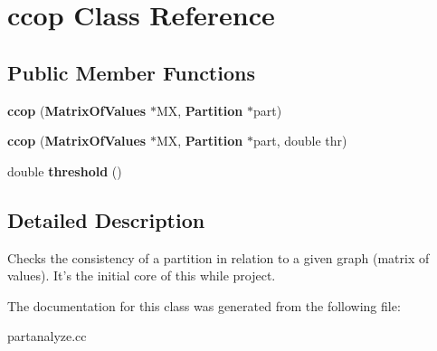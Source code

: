 \section{ccop Class Reference}
\label{classccop}
\subsection*{Public Member Functions}
\begin{CompactItemize}
\item 
{\bf ccop} ({\bf Matrix\-Of\-Values} $\ast$MX, {\bf Partition} $\ast$part)\label{classccop_a0}

\item 
{\bf ccop} ({\bf Matrix\-Of\-Values} $\ast$MX, {\bf Partition} $\ast$part, double thr)\label{classccop_a1}

\item 
double {\bf threshold} ()\label{classccop_a2}

\end{CompactItemize}


\subsection{Detailed Description}
Checks the consistency of a partition in relation to a given graph (matrix of values). It's the initial core of this while project. 



The documentation for this class was generated from the following file:\begin{CompactItemize}
\item 
partanalyze.cc\end{CompactItemize}
